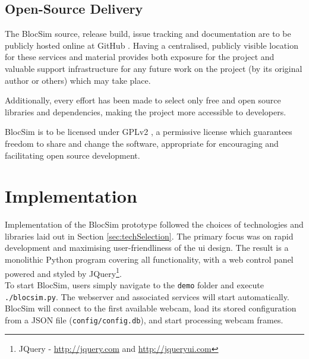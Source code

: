 

\section{Open-Source Delivery}

The BlocSim source, release build, issue tracking and documentation are to be publicly hosted online at GitHub \cite{blocsim}\cite{github}. Having a centralised, publicly visible location for these services and material provides both exposure for the project and valuable support infrastructure for any future work on the project (by its original author or others) which may take place. 

Additionally, every effort has been made to select only free and open source libraries and dependencies, making the project more accessible to developers.

BlocSim is to be licensed under GPLv2 \cite{gplv2}, a permissive license which guarantees freedom to share and change the software, appropriate for encouraging and facilitating open source development.
\\



\chapter{Implementation}

Implementation of the BlocSim prototype followed the choices of technologies and libraries laid out in Section \ref{sec:techSelection}. The primary focus was on rapid development and maximising user-friendliness of the \gls{ui} design. The result is a monolithic Python program covering all functionality, with a web control panel powered and styled by JQuery\footnote{JQuery - \url{http://jquery.com} and \url{http://jqueryui.com}}.
\\

To start BlocSim, users simply navigate to the \texttt{demo} folder and execute \texttt{./blocsim.py}. The webserver and associated services will start automatically. BlocSim will connect to the first available webcam, load its stored configuration from a JSON file (\texttt{config/config.db}), and start processing webcam frames.
\\

\newpage

